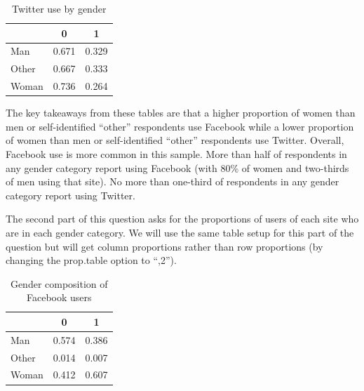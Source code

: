 \documentclass[
  letterpaper,
  DIV=11,
  numbers=noendperiod]{scrartcl}
\newenvironment{Shaded}{\begin{snugshade}}{\end{snugshade}}
\newcommand{\AttributeTok}[1]{\textcolor[rgb]{0.40,0.45,0.13}{#1}}
\newcommand{\ConstantTok}[1]{\textcolor[rgb]{0.56,0.35,0.01}{#1}}
\newcommand{\DecValTok}[1]{\textcolor[rgb]{0.68,0.00,0.00}{#1}}
\newcommand{\FunctionTok}[1]{\textcolor[rgb]{0.28,0.35,0.67}{#1}}
\newcommand{\NormalTok}[1]{\textcolor[rgb]{0.00,0.23,0.31}{#1}}
\newcommand{\SpecialCharTok}[1]{\textcolor[rgb]{0.37,0.37,0.37}{#1}}
\newcommand{\StringTok}[1]{\textcolor[rgb]{0.13,0.47,0.30}{#1}}
\begin{document}
\begin{table}[!h]

\caption{Twitter use by gender}
\centering
\begin{tabular}[t]{lcc}
\toprule
  & 0 & 1\\
\midrule
Man & 0.671 & 0.329\\
Other & 0.667 & 0.333\\
Woman & 0.736 & 0.264\\
\bottomrule
\end{tabular}
\end{table}

The key takeaways from these tables are that a higher proportion of
women than men or self-identified ``other'' respondents use Facebook
while a lower proportion of women than men or self-identified ``other''
respondents use Twitter. Overall, Facebook use is more common in this
sample. More than half of respondents in any gender category report
using Facebook (with 80\% of women and two-thirds of men using that
site). No more than one-third of respondents in any gender category
report using Twitter.

The second part of this question asks for the proportions of users of
each site who are in each gender category. We will use the same table
setup for this part of the question but will get column proportions
rather than row proportions (by changing the prop.table option to
``,2'').

\begin{Shaded}
\end{Shaded}

\begin{table}[!h]

\caption{Gender composition of Facebook users}
\centering
\begin{tabular}[t]{lcc}
\toprule
  & 0 & 1\\
\midrule
Man & 0.574 & 0.386\\
Other & 0.014 & 0.007\\
Woman & 0.412 & 0.607\\
\bottomrule
\end{tabular}
\end{table}
\end{document}
